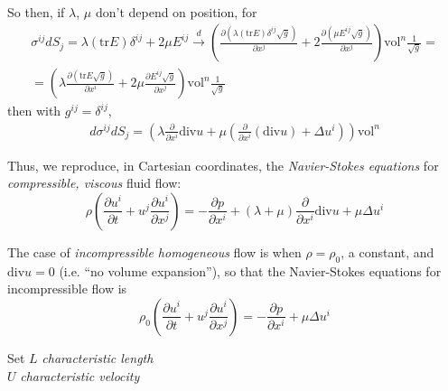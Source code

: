 \documentclass[twoside,landscape,10pt]{amsart}
\theoremstyle{plain}
\theoremstyle{definition}
\theoremstyle{remark}
\theoremstyle{remark}
\begin{document}
\begin{multicols*}{2}
\[\begin{gathered}
\end{gathered}
\]
So then, if $\lambda$, $\mu$ don't depend on position, for 
\[
\begin{gathered}
  \sigma^{ij} dS_j = \lambda (\text{tr}E) \delta^{ij} + 2\mu E^{ij} \xrightarrow{ d} \left( \frac{ \partial ( \lambda (\text{tr}E ) \delta^{ij }\sqrt{g} )}{ \partial x^j} + 2 \frac{ \partial ( \mu E^{ij} \sqrt{g}) }{ \partial x^j} \right)\text{vol}^n \frac{1}{\sqrt{g}}= \\
  = \left( \lambda \frac{ \partial (\text{tr}E\sqrt{g})}{ \partial x^i } + 2\mu \frac{ \partial E^{ij}\sqrt{g}}{ \partial x^j } \right) \text{vol}^n \frac{1}{\sqrt{g}}
\end{gathered}
\]
then with $g^{ij} = \delta^{ij}$,
\[
\begin{gathered}
  d \sigma^{ij} dS_j = \left( \lambda \frac{ \partial }{ \partial x^i} \text{div}u + \mu \left( \frac{\partial }{ \partial x^i} (\text{div}u ) + \Delta u^i \right) \right)\text{vol}^n
\end{gathered}
\]

Thus, we reproduce, in Cartesian coordinates, the \emph{Navier-Stokes equations} for \emph{compressible, viscous} fluid flow:
\begin{equation}
\boxed{
  \rho \left( \frac{ \partial u^i}{ \partial t} + u^j \frac{ \partial u^i}{ \partial x^j} \right) = - \frac{ \partial p}{ \partial x^i} + (\lambda +  \mu ) \frac{ \partial}{\partial x^i} \text{div}u + \mu \Delta u^i
}
\end{equation}

The case of \emph{incompressible homogeneous} flow is when $\rho = \rho_0$, a constant, and $\text{div}u=0$ (i.e. ``no volume expansion''), so that the Navier-Stokes equations for incompressible flow is 
\[
\rho_0 \left( \frac{ \partial u^i}{ \partial t} + u^j \frac{ \partial u^i}{ \partial x^j} \right) = -\frac{ \partial p }{ \partial x^i} + \mu \Delta u^i
\]

Set $L$ \emph{characteristic length} \\
\phantom{Set }$U$ \emph{characteristic velocity}


\end{multicols*}
\end{document}
